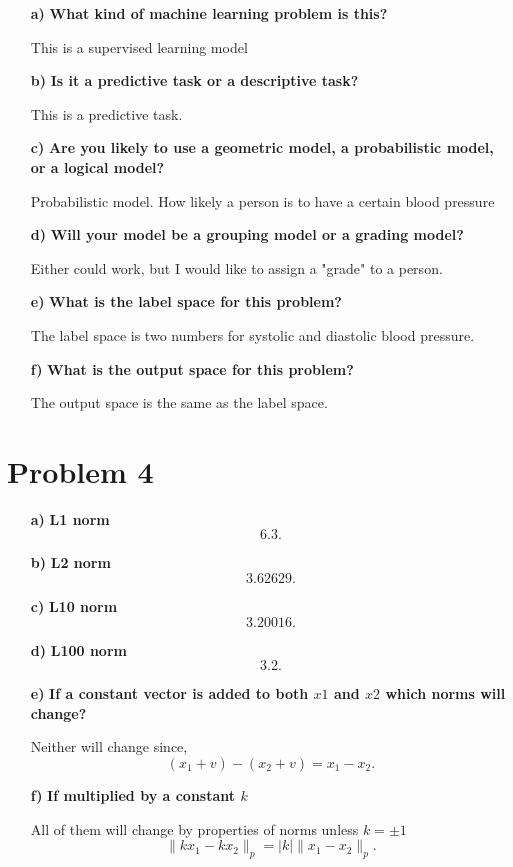 \begin{enumerate}
  \item[ \textbf{a)}] \textbf{What kind of machine learning problem is this?}
    \par This is a supervised learning model
  \item[\textbf{b)}] \textbf{Is it a predictive task or a descriptive task?}
    \par This is a predictive task.
  \item[\textbf{c)}] \textbf{Are you likely to use a geometric model, a probabilistic
    model, or a logical model?}
    \par Probabilistic model. How likely a person is to have a certain blood
    pressure
  \item[\textbf{d)}] \textbf{Will your model be a grouping model or a grading model?}
    \par Either could work, but I would like to assign a "grade" to a person.
  \item[\textbf{e)}] \textbf{What is the label space for this problem?}
    \par The label space is two numbers for systolic and diastolic blood
    pressure.
  \item[\textbf{f)}] \textbf{What is the output space for this problem?}
    \par The output space is the same as the label space.
\end{enumerate}

\section{Problem 4}
\begin{itemize}
  \item[ \textbf{a)} ] \textbf{L1 norm} 
    \[
    \boxed{6.3}
    .\] 
  \item[ \textbf{b)} ]\textbf{L2 norm}
    \[
    \boxed{3.62629}
    .\] 
  \item[ \textbf{c)} ]\textbf{L10 norm}
    \[
    \boxed{3.20016}
    .\] 
  \item[ \textbf{d)} ]\textbf{L100 norm}
    \[
    \boxed{3.2}
    .\] 
  \item[ \textbf{e)} ] \textbf{If a constant vector is added to both $x1$ and
    $x2$ which norms will change?} 
    \par Neither will change since,
    \[
      (x_1+v)-(x_2+v) = x_1-x_2
    .\] 
  \item[ \textbf{f)} ] \textbf{If multiplied by a constant $k$} 
    \par All of them will change by properties of norms unless $k=\pm1$
    \[
      \|kx_1-kx_2\|_{p} = |k|\|x_1-x_2\|_{p}
    .\] 
\end{itemize}

